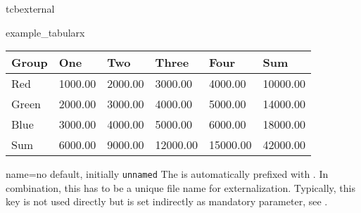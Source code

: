 \begin{docEnvironment}[doc new=2015-03-11]{tcbexternal}{}
\begin{dispExample}
\begin{tcbexternal}[minipage]{example_tabularx}
  \begin{tabularx}{\linewidth}{|l||Y|Y|Y|Y||Y|}\hline
    Group & One & Two & Three & Four & Sum\\\hline\hline
    Red & 1000.00 & 2000.00 & 3000.00 & 4000.00 & 10000.00\\\hline
    Green & 2000.00 & 3000.00 & 4000.00 & 5000.00 & 14000.00\\\hline
    Blue & 3000.00 & 4000.00 & 5000.00 & 6000.00 & 18000.00\\\hline\hline
    Sum & 6000.00 & 9000.00 & 12000.00 & 15000.00 & 42000.00\\\hline
  \end{tabularx}
\end{tcbexternal}
\end{dispExample}


\end{docEnvironment}

\begin{extTcbKey}[][doc new=2015-03-11]{name}{=}{no default,
  initially \texttt{unnamed}}
The  is automatically prefixed with .
In combination, this has to be a unique file name for externalization.
Typically, this key is not used directly but is set indirectly as
mandatory parameter, see .
\end{extTcbKey}


